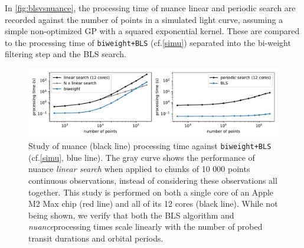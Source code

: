 \documentclass[modern]{aastex631}
\newcommand{\nuancemethod}{\textit{nuance}}
\newcommand{\nuancecode}{\textsf{nuance}}
\begin{document}
\noindent In \autoref{fig:blsvsnuance}, the processing time of \nuancecode{} linear and periodic search are recorded against the number of points in a simulated light curve, assuming a simple non-optimized GP with a squared exponential kernel. These are compared to the processing time of \texttt{biweight+BLS} (cf.\;\autoref{simu}) separated into the bi-weight filtering step and the \textsf{BLS} search.
\begin{figure}[H]
    \begin{centering}
        \includegraphics[width=\linewidth]{../workflows/benchmark/figures/nuance_vs_bls.pdf}
        \caption{Study of \textsf{nuance} (black line) processing time against \texttt{biweight+BLS} (cf.\;\autoref{simu}, blue line). The gray curve shows the performance of \textsf{nuance} \textit{linear search} when applied to chunks of 10 000 points continuous observations, instead of considering these observations all together. This study is performed on both a single core of an Apple M2 Max chip (red line) and all of its 12 cores (black line). While not being shown, we verify that both the \textsf{BLS} algorithm and \nuancemethod{}processing times scale linearly with the number of probed transit durations and orbital periods.}
        \label{fig:blsvsnuance}
    \end{centering}
\end{figure}
\end{document}
